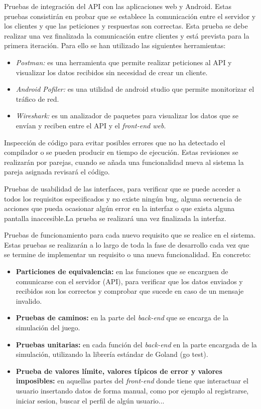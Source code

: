 \documentclass{article}
\begin{document}
Pruebas de integración del API con las aplicaciones web y Android. Estas pruebas consistirán en probar que se establece la comunicación entre el servidor y los clientes y que las peticiones y respuestas son correctas. Esta prueba se debe realizar una vez finalizada la comunicación entre clientes y está prevista para la primera iteración. Para ello se han utilizado las siguientes herramientas:
\begin{itemize}
	\item \textit{Postman:} es una herramienta que permite realizar peticiones al API y visualizar los datos recibidos sin necesidad de crear un cliente.
	\item \textit{Android Pofiler:} es una utilidad de android studio que permite monitorizar el tráfico de red. 
	\item \textit{Wireshark:} es un analizador de paquetes para visualizar los datos que se envían y reciben entre el API y el \textit{front-end web}. 
\end{itemize}  

Inspección de código para evitar posibles errores que no ha detectado el compilador o se pueden producir en tiempo de ejecución. Estas revisiones se realizarán por parejas, cuando se añada una funcionalidad nueva al sistema la pareja asignada revisará el código.

Pruebas de usabilidad de las interfaces, para verificar que se puede acceder a todos los requisitos especificados y no existe ningún bug, alguna secuencia de acciones que pueda ocasionar algún error en la interfaz o que exista alguna pantalla inaccesible.La prueba se realizará una vez finalizada la interfaz.

Pruebas de funcionamiento para cada nuevo requisito que se realice en el sistema. Estas pruebas se realizarán a lo largo de toda la fase de desarrollo cada vez que se termine de implementar un requisito o una nueva funcionalidad. En concreto:
\begin{itemize}
	\item \textbf{Particiones de equivalencia:} en las funciones que se encarguen de comunicarse con el servidor (API), para verificar que los datos enviados y recibidos son los correctos y comprobar que sucede en caso de un mensaje invalido.
	\item \textbf{Pruebas de caminos:} en la parte del \textit{back-end} que se encarga de la simulación del juego.
	\item \textbf{Pruebas unitarias:} en cada función del \textit{back-end} en la parte encargada de la simulación, utilizando la librería estándar de Goland (go test).
	\item \textbf{Prueba de valores límite, valores típicos de error y valores imposibles:} en aquellas partes del \textit{front-end} donde tiene que interactuar el usuario insertando datos de forma manual, como por ejemplo al registrarse, iniciar sesion, buscar el perfil de algún usuario...
\end{itemize}
\end{document}

